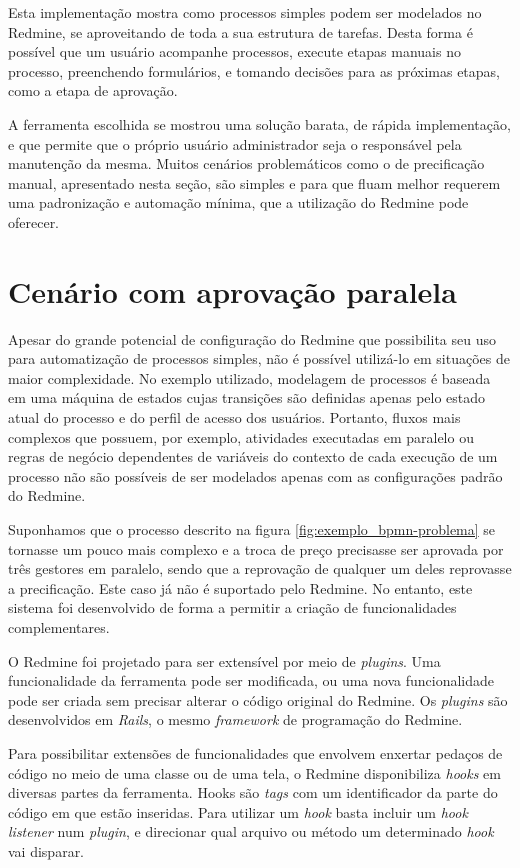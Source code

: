 Esta implementação mostra como processos simples podem ser modelados no Redmine, se aproveitando de toda a sua estrutura de tarefas. Desta forma é possível que um usuário acompanhe processos, execute etapas manuais no processo, preenchendo formulários, e tomando decisões para as próximas etapas, como a etapa de aprovação.

A ferramenta escolhida se mostrou uma solução barata, de rápida implementação, e que permite que o próprio usuário administrador seja o responsável pela manutenção da mesma. 
Muitos cenários problemáticos como o de precificação manual, apresentado nesta seção, são simples e para que fluam melhor requerem uma padronização e automação mínima, que a utilização do Redmine pode oferecer.

\section{Cenário com aprovação paralela}\label{sec:cenario-complexo}

Apesar do grande potencial de configuração do Redmine que possibilita seu uso para automatização de processos simples, não é possível utilizá-lo em situações de maior complexidade. No exemplo utilizado, modelagem de processos é baseada em uma máquina de estados cujas transições são definidas apenas pelo estado atual do processo e do perfil de acesso dos usuários. Portanto, fluxos mais complexos que possuem, por exemplo, atividades executadas em paralelo ou regras de negócio dependentes de variáveis do contexto de cada execução de um processo não são possíveis de ser modelados apenas com as configurações padrão do Redmine.

Suponhamos que o processo descrito na figura \ref{fig:exemplo_bpmn-problema} se tornasse um pouco mais complexo e a troca de preço precisasse ser aprovada por três gestores em paralelo, sendo que a reprovação de qualquer um deles reprovasse a precificação. Este caso já não é suportado pelo Redmine. No entanto, este sistema foi desenvolvido de forma a permitir a criação de funcionalidades complementares.

O Redmine foi projetado para ser extensível por meio de \textit{plugins}. Uma funcionalidade da ferramenta pode ser modificada, ou uma nova funcionalidade pode ser criada sem precisar alterar o código original do Redmine. Os \textit{plugins} são desenvolvidos em \textit{Rails}, o mesmo \textit{framework} de programação do Redmine. 

Para possibilitar extensões de funcionalidades que envolvem enxertar pedaços de código no meio de uma classe ou de uma tela, o Redmine disponibiliza \textit{hooks} em diversas partes da ferramenta. Hooks são \textit{tags} com um identificador da parte do código em que estão inseridas. Para utilizar um \textit{hook} basta incluir um \textit{hook} \textit{listener} num \textit{plugin}, e direcionar qual arquivo ou método um determinado \textit{hook} vai disparar.

